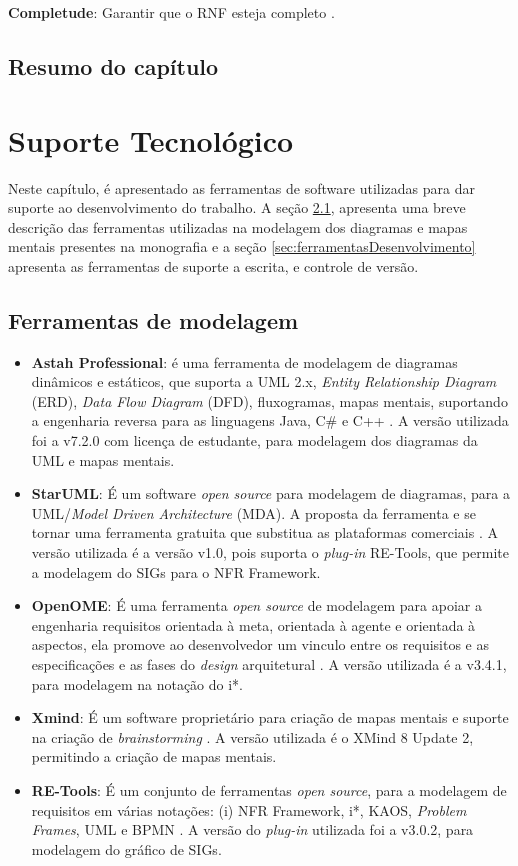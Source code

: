 \textbf{Completude}: Garantir que o RNF esteja completo \cite{chung2012non}. 

\section{Resumo do capítulo}


\chapter{Suporte Tecnológico}

Neste capítulo, é apresentado as ferramentas de software utilizadas para dar suporte ao desenvolvimento do trabalho. A seção \ref{sec:ferramentasModelagem}, apresenta uma breve descrição das ferramentas utilizadas na modelagem dos diagramas e mapas mentais presentes na monografia e a seção \ref{sec:ferramentasDesenvolvimento} apresenta as ferramentas de suporte a escrita, e controle de versão. 

\section{Ferramentas de modelagem}
\label{sec:ferramentasModelagem}

\begin{itemize}
	\item \textbf{Astah Professional}: é uma ferramenta de modelagem de diagramas dinâmicos e estáticos, que suporta a UML 2.x, \textit{Entity Relationship Diagram} (ERD), \textit{Data Flow Diagram} (DFD), fluxogramas, mapas mentais, suportando a engenharia reversa para as linguagens Java, C\# e C++ \cite{astah}. A versão utilizada foi a v7.2.0 com licença de estudante, para modelagem dos diagramas da UML e mapas mentais.   
	\item \textbf{StarUML}: É um software \textit{open source} para modelagem de diagramas, para a UML/\textit{Model Driven Architecture} (MDA). A proposta da ferramenta e se tornar uma ferramenta gratuita que substitua as plataformas comerciais \cite{starUML}. A versão utilizada é a versão v1.0, pois suporta o \textit{plug-in} RE-Tools, que permite a modelagem do SIGs para o NFR Framework. 
	\item \textbf{OpenOME}: É uma ferramenta \textit{open source} de modelagem para apoiar a engenharia requisitos orientada à meta, orientada à agente e orientada à aspectos, ela promove ao desenvolvedor um vinculo entre os requisitos e as especificações e as fases do \textit{design} arquitetural \cite{openOME}. A versão utilizada é a v3.4.1, para modelagem na notação do i*. 
	\item \textbf{Xmind}: É um software proprietário para criação de mapas mentais e suporte na criação de \textit{brainstorming} \cite{xMind}. A versão utilizada é o XMind 8 Update 2, permitindo a criação de mapas mentais. 
	\item \textbf{RE-Tools}: É um conjunto de ferramentas \textit{open source}, para a modelagem de requisitos em várias notações: (i) NFR Framework, i*, KAOS, \textit{Problem Frames}, UML e BPMN \cite{reTools}. A versão do \textit{plug-in} utilizada foi a v3.0.2, para modelagem do gráfico de SIGs.   
\end{itemize}

